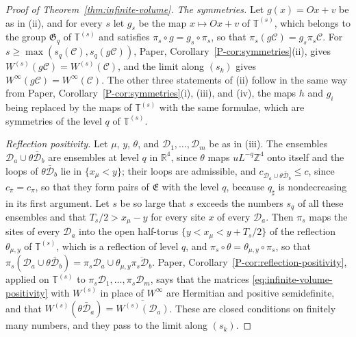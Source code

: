 \documentclass[11pt]{preprint}
\numberwithin{equation}{section}
\theoremstyle{definition}
\theoremstyle{remark}
\theoremstyle{plain}
\begin{document}
\begin{proof}[Proof of Theorem~\ref{thm:infinite-volume}]
\emph{The symmetries.} Let $g(x) = Ox + v$ be as in (ii), and for every $s$ let $g_s$ be the map $x \mapsto Ox + v$ of $\mathbb T^{(s)}$, which belongs to the group $\mathfrak G_q$ of $\mathbb T^{(s)}$ and satisfies $\pi_s \circ g = g_s \circ \pi_s$, so that $\pi_s(g\mathcal C) = g_s\pi_s\mathcal C$. For $s \geq \max(s_q(\mathcal C), s_q(g\mathcal C))$, Paper, Corollary~\ref{P-cor:symmetries}(ii), gives $W^{(s)}(g\mathcal C) = W^{(s)}(\mathcal C)$, and the limit along $(s_k)$ gives $W^\infty(g\mathcal C) = W^\infty(\mathcal C)$. The other three statements of (ii) follow in the same way from Paper, Corollary~\ref{P-cor:symmetries}(i), (iii), and (iv), the maps $h$ and $g_i$ being replaced by the maps of $\mathbb T^{(s)}$ with the same formulae, which are symmetries of the level $q$ of $\mathbb T^{(s)}$.

\emph{Reflection positivity.} Let $\mu$, $y$, $\theta$, and $\mathcal D_1, \dots, \mathcal D_m$ be as in (iii). The ensembles $\mathcal D_a \cup \theta\bar{\mathcal D}_b$ are ensembles at level $q$ in $\mathbb R^4$, since $\theta$ maps $uL^{-q}\mathbb Z^4$ onto itself and the loops of $\theta\bar{\mathcal D}_b$ lie in $\{ x_\mu < y \}$; their loops are admissible, and $c_{\mathcal D_a \cup \theta\bar{\mathcal D}_b} \leq c$, since $c_{\bar\pi} = c_\pi$, so that they form pairs of $\mathfrak E$ with the level $q$, because $q_\sharp$ is nondecreasing in its first argument. Let $s$ be so large that $s$ exceeds the numbers $s_q$ of all these ensembles and that $T_s/2 > x_\mu - y$ for every site $x$ of every $\mathcal D_a$. Then $\pi_s$ maps the sites of every $\mathcal D_a$ into the open half-torus $\{ y < x_\mu < y + T_s/2 \}$ of the reflection $\theta_{\mu,y}$ of $\mathbb T^{(s)}$, which is a reflection of level $q$, and $\pi_s \circ \theta = \theta_{\mu,y} \circ \pi_s$, so that $\pi_s(\mathcal D_a \cup \theta\bar{\mathcal D}_b) = \pi_s\mathcal D_a \cup \theta_{\mu,y}\overline{\pi_s\mathcal D_b}$. Paper, Corollary~\ref{P-cor:reflection-positivity}, applied on $\mathbb T^{(s)}$ to $\pi_s\mathcal D_1, \dots, \pi_s\mathcal D_m$, says that the matrices \eqref{eq:infinite-volume-positivity} with $W^{(s)}$ in place of $W^\infty$ are Hermitian and positive semidefinite, and that $W^{(s)}(\theta\bar{\mathcal D}_a) = \overline{W^{(s)}(\mathcal D_a)}$. These are closed conditions on finitely many numbers, and they pass to the limit along $(s_k)$.
\end{proof}
\end{document}
